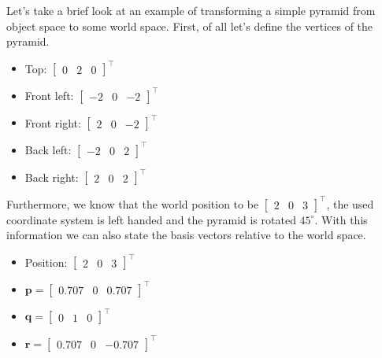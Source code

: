 \documentclass[a4paper,11pt]{article}
\begin{document}
Let's take a brief look at an example of transforming a simple pyramid from object space to some world space. First, of all let's define the vertices of the pyramid.

\begin{itemize}
	\item Top: $\begin{bmatrix}
		0 & 2 & 0
	\end{bmatrix}^\intercal$
	\item Front left: $\begin{bmatrix}
		-2 & 0 & -2
	\end{bmatrix}^\intercal$
	\item Front right: $\begin{bmatrix}
		2 & 0 & -2
	\end{bmatrix}^\intercal$
	\item Back left: $\begin{bmatrix}
		-2 & 0 & 2
	\end{bmatrix}^\intercal$
	\item Back right: $\begin{bmatrix}
		2 & 0 & 2
	\end{bmatrix}^\intercal$
\end{itemize}

Furthermore, we know that the world position to be $\begin{bmatrix}2 & 0 & 3\end{bmatrix}^\intercal$, the used coordinate system is left handed and the pyramid is rotated $45^\circ$. With this information we can also state the basis vectors relative to the world space.

\begin{itemize}
	\item Position: $\begin{bmatrix}2 & 0 & 3\end{bmatrix}^\intercal$
	\item $\textbf{p}=\begin{bmatrix}0.707 & 0 & 0.707\end{bmatrix}^\intercal$
	\item $\textbf{q}=\begin{bmatrix}0 & 1 & 0\end{bmatrix}^\intercal$
	\item $\textbf{r}=\begin{bmatrix}0.707 & 0 & -0.707\end{bmatrix}^\intercal$
\end{itemize}
\end{document}
